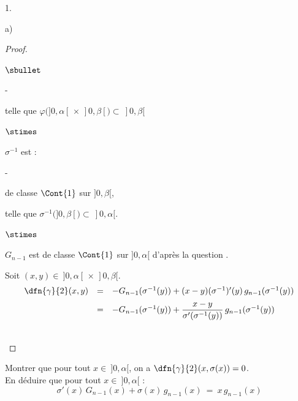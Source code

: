 \documentclass[11pt]{article}%
\begin{document}
\begin{noliste}{1.}
\begin{noliste}{a)}
\begin{proof}
\begin{noliste}{$\sbullet$}
\begin{liste}{-}
	    \item telle que $\varphi(]0,\alpha[ \, \times \, ]0, 
	    \beta[) \subset \ ]0,\beta[$
	  \end{liste}
	\begin{noliste}{$\stimes$}
	  \item $\sigma^{-1}$ est :~\\[-.6cm]
	\end{noliste}
	  \begin{liste}{-}
	    \item de classe $\Cont{1}$ sur $]0,\beta[$,
	    \item telle que $\sigma^{-1}(]0,\beta[) \subset \ 
	    ]0,\alpha[$.
	  \end{liste}
	\begin{noliste}{$\stimes$}
	  \item $G_{n-1}$ est de classe $\Cont{1}$ sur $]0,\alpha[$
	  d'après la question .
	\end{noliste}
      \end{noliste}
      \conc{La fonction $\gamma$ est de classe $\Cont{1}$ sur $]0,
      \alpha[ \, \times \, ]0,\beta[$ en tant que produit de 
      fonctions \\[.1cm]
      de classe $\Cont{1}$ sur $]0,\alpha[ \, \times \,
      ]0,\beta[$.}
      
      Soit $(x,y) \in \ ]0,\alpha[ \, \times \, ]0,\beta[$.
      \[
       \begin{array}{rcl}
        \dfn{\gamma}{2}(x,y) & = & - G_{n-1}(\sigma^{-1}(y)) +
        (x-y) (\sigma^{-1})'(y) \, g_{n-1}(\sigma^{-1}(y))
        \\[.2cm]
        & = & - G_{n-1}(\sigma^{-1}(y)) + \dfrac{x-y}{\sigma'(\sigma^{-1}
        (y))} \, g_{n-1}(\sigma^{-1}(y))
       \end{array}
      \]
      \conc{$\forall (x,y) \in \ ]0,\alpha[ \, \times \, ]0,\beta[$,
      $\dfn{\gamma}{2}(x,y) \ = \ - G_{n-1}(\sigma^{-1}(y)) + 
      \dfrac{x-y}{\sigma'(\sigma^{-1}
      (y))} \, g_{n-1}(\sigma^{-1}(y))$}
      
      ~\\[-1.4cm]
    \end{proof}

    \item Montrer que pour tout $x \in \ ]0, \alpha[$, on a 
    $\dfn{\gamma}{2}(x, \sigma(x))=0$.\\
    En déduire que pour tout $x \in \ ]0, \alpha[$ : 
    \[
      \sigma'(x) \, G_{n-1}(x) + \sigma(x) \, g_{n-1}(x) \ = \
      x \, g_{n-1}(x)
    \]
    

\end{noliste}
\end{noliste}
\end{document}
